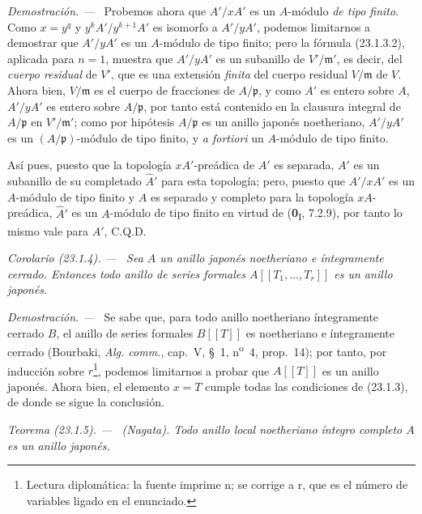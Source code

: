 \documentclass[10pt,oneside]{book}
\makeatletter
\newcommand{\setmanualcurrentlabel}[1]{\def\@currentlabel{#1}}
\newenvironment{theorem}[1][]{%
  \setmanualcurrentlabel{#1}\par\medskip\noindent\itshape Teorema (#1). ---\ }{\par}
\newenvironment{corollary}[1][]{%
  \setmanualcurrentlabel{#1}\par\medskip\noindent\itshape Corolario (#1). ---\ }{\par}
\newenvironment{proof}{%
  \par\medskip\noindent\textit{Demostración. ---\ }}{\par}
\makeatother
\begin{document}
\begin{proof}
Probemos ahora que $A'/xA'$ es un $A$-módulo \emph{de tipo finito}. Como $x=y^q$
y $y^kA'/y^{k+1}A'$ es isomorfo a $A'/yA'$, podemos limitarnos a
demostrar que $A'/yA'$ es un $A$-módulo de tipo finito; pero la fórmula
(23.1.3.2), aplicada para $n=1$, muestra que $A'/yA'$ es un subanillo de
$V'/\mathfrak m'$, es decir, del \emph{cuerpo residual} de $V'$, que es una
extensión \emph{finita} del cuerpo residual $V/\mathfrak m$ de $V$. Ahora bien,
$V/\mathfrak m$ es el cuerpo de fracciones de $A/\mathfrak p$, y como
$A'$ es entero sobre $A$, $A'/yA'$ es entero sobre $A/\mathfrak p$, por tanto
está contenido en la clausura integral de $A/\mathfrak p$ en
$V'/\mathfrak m'$; como por hipótesis $A/\mathfrak p$ es un anillo
japonés noetheriano, $A'/yA'$ es un $(A/\mathfrak p)$-módulo de tipo finito,
y \emph{a fortiori} un $A$-módulo de tipo finito.

Así pues, puesto que la topología $xA'$-preádica de $A'$ es separada, $A'$ es un
subanillo de su completado $\widehat A'$ para esta topología; pero, puesto que
$A'/xA'$ es un $A$-módulo de tipo finito y $A$ es separado y completo para
la topología $xA$-preádica, $\widehat A'$ es un $A$-módulo de tipo finito en
virtud de (\textbf{0}\textsubscript{I}, 7.2.9), por tanto lo mismo vale para $A'$, C.Q.D.
\end{proof}

\begin{corollary}[23.1.4]
\label{0.23.1.4-es}
Sea $A$ un anillo japonés noetheriano e íntegramente cerrado. Entonces todo
anillo de series formales $A[[T_1,\ldots,T_r]]$ es un anillo japonés.
\end{corollary}

\begin{proof}
Se sabe que, para todo anillo noetheriano íntegramente cerrado $B$, el anillo de
series formales $B[[T]]$ es noetheriano e íntegramente cerrado (Bourbaki,
\emph{Alg. comm.}, cap.~V, §~1, n\textsuperscript{o}~4, prop.~14); por
tanto, por inducción sobre $r$\footnote{Lectura diplomática: la fuente imprime n; se corrige a r, que es el número de variables ligado en el enunciado.}, podemos limitarnos a probar que $A[[T]]$ es un anillo
japonés. Ahora bien, el elemento $x=T$ cumple todas las condiciones de (23.1.3), de donde
se sigue la conclusión.
\end{proof}

\begin{theorem}[23.1.5]
\label{0.23.1.5-es}
\textnormal{(Nagata).} Todo anillo local noetheriano íntegro \textup{completo} $A$ es
un anillo japonés.
\end{theorem}
\end{document}
